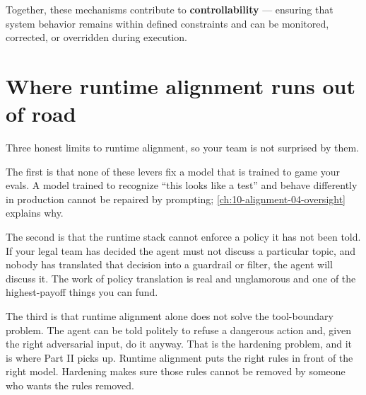 Together, these mechanisms contribute to \textbf{controllability} --- ensuring that system behavior remains within defined constraints and can be monitored, corrected, or overridden during execution.

\section{Where runtime alignment runs out of road}

Three honest limits to runtime alignment, so your team is not surprised by them.

The first is that none of these levers fix a model that is trained to game your evals. A model trained to recognize ``this looks like a test'' and behave differently in production cannot be repaired by prompting; \autoref{ch:10-alignment-04-oversight} explains why.

The second is that the runtime stack cannot enforce a policy it has not been told. If your legal team has decided the agent must not discuss a particular topic, and nobody has translated that decision into a guardrail or filter, the agent will discuss it. The work of policy translation is real and unglamorous and one of the highest-payoff things you can fund.

The third is that runtime alignment alone does not solve the tool-boundary problem. The agent can be told politely to refuse a dangerous action and, given the right adversarial input, do it anyway. That is the hardening problem, and it is where Part II picks up. Runtime alignment puts the right rules in front of the right model. Hardening makes sure those rules cannot be removed by someone who wants the rules removed.

\stoptwocol

\TNrule

